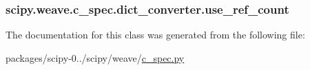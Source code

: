 \subsubsection[{use\+\_\+ref\+\_\+count}]{\setlength{\rightskip}{0pt plus 5cm}scipy.\+weave.\+c\+\_\+spec.\+dict\+\_\+converter.\+use\+\_\+ref\+\_\+count}\label{classscipy_1_1weave_1_1c__spec_1_1dict__converter_a6fba054788b0ab3c1ef88652b61320e7}


The documentation for this class was generated from the following file\+:\begin{DoxyCompactItemize}
\item 
packages/scipy-\/0../scipy/weave/\hyperlink{c__spec_8py}{c\+\_\+spec.\+py}\end{DoxyCompactItemize}
